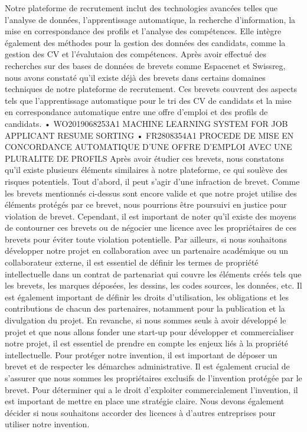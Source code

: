  \begin{itemize}
    Notre plateforme de recrutement inclut des technologies avancées telles que l’analyse de données, l’apprentissage automatique, la recherche d’information, la mise en correspondance des profils et l’analyse des compétences. Elle intègre également des méthodes pour la gestion des données des candidats, comme la gestion des CV et l’évalutaion des compétences.
Après avoir effectué des recherches sur des bases de données de brevets comme Espacenet et Swissreg, nous avons constaté qu'il existe déjà des brevets dans certains domaines techniques de notre plateforme de recrutement. Ces brevets couvrent des aspects tels que l'apprentissage automatique pour le tri des CV de candidats et la mise en correspondance automatique entre une offre d'emploi et des profils de candidats.
•	WO2019068253A1 MACHINE LEARNING SYSTEM FOR JOB APPLICANT RESUME SORTING
•	FR2808354A1 PROCEDE DE MISE EN CONCORDANCE AUTOMATIQUE D'UNE OFFRE D'EMPLOI AVEC UNE PLURALITE DE PROFILS
Après avoir étudier ces  brevets, nous constatons qu’il existe plusieurs éléments similaires à notre plateforme, ce qui soulève des risques potentiels.
Tout d’abord, il peut s’agir d’une infraction de brevet. Comme les brevets mentionnés ci-dessus sont encore valide et que notre projet utilise des éléments protégés par ce brevet, nous pourrions être poursuivi en justice pour violation de brevet. 
Cependant, il est important de noter qu'il existe des moyens de contourner ces brevets ou de négocier une licence avec les propriétaires de ces brevets pour éviter toute violation potentielle. 
Par ailleurs, si nous souhaitons développer notre projet en collaboration avec un partenaire académique ou un collaborateur externe, il est essentiel de définir les termes de propriété intellectuelle dans un contrat de partenariat qui couvre les éléments créés tels que les brevets, les marques déposées, les dessins, les codes sources, les données, etc. Il est également important de définir les droits d'utilisation, les obligations et les contributions de chacun des partenaires, notamment pour la publication et la divulgation du projet.
En revanche, si nous sommes seuls à avoir développé le projet et que nous allons fonder une start-up pour développer et commercialiser notre projet, il est essentiel de prendre en compte les enjeux liés à la propriété intellectuelle. Pour protéger notre invention, il est important de déposer un brevet et de  respecter les démarches administrative. Il est également crucial de s'assurer que nous sommes les propriétaires exclusifs de l'invention protégée par le brevet. Pour déterminer qui a le droit d'exploiter commercialement l'invention, il est important de mettre en place une stratégie claire. Nous devons également décider si nous souhaitons accorder des licences à d'autres entreprises pour utiliser notre invention.

\end{itemize}
